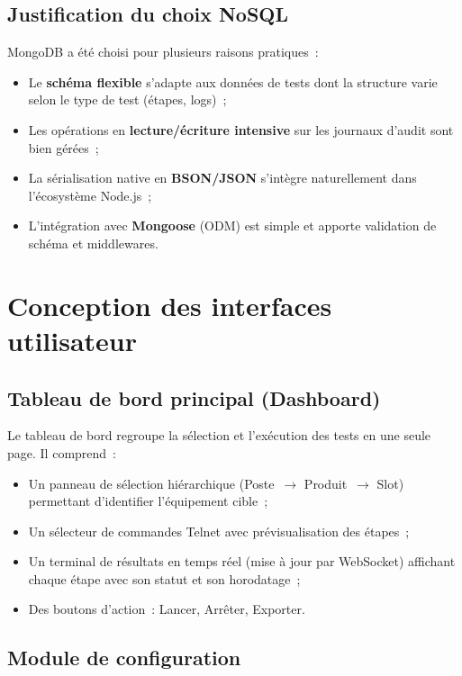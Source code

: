 \subsection{Justification du choix NoSQL}

MongoDB a été choisi pour plusieurs raisons pratiques~:
\begin{itemize}
  \item Le \textbf{schéma flexible} s'adapte aux données de tests dont
        la structure varie selon le type de test (étapes, logs)~;
  \item Les opérations en \textbf{lecture/écriture intensive} sur les
        journaux d'audit sont bien gérées~;
  \item La sérialisation native en \textbf{BSON/JSON} s'intègre
        naturellement dans l'écosystème Node.js~;
  \item L'intégration avec \textbf{Mongoose} (ODM) est simple et apporte
        validation de schéma et middlewares.
\end{itemize}

\section{Conception des interfaces utilisateur}

\subsection{Tableau de bord principal (Dashboard)}

Le tableau de bord regroupe la sélection et l'exécution des tests en
une seule page. Il comprend~:
\begin{itemize}
  \item Un panneau de sélection hiérarchique (Poste~$\to$ Produit~$\to$
        Slot) permettant d'identifier l'équipement cible~;
  \item Un sélecteur de commandes Telnet avec prévisualisation des étapes~;
  \item Un terminal de résultats en temps réel (mise à jour par WebSocket)
        affichant chaque étape avec son statut et son horodatage~;
  \item Des boutons d'action~: Lancer, Arrêter, Exporter.
\end{itemize}


\subsection{Module de configuration}

